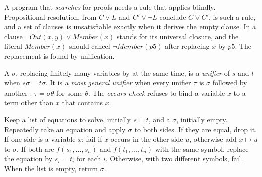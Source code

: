 A program that \emph{searches} for proofs needs a rule that applies blindly. Propositional resolution, from $C \vee L$ and
$C' \vee \neg L$ conclude $C \vee C'$, is such a rule, and a set of clauses is unsatisfiable exactly when it derives the
empty clause. In  a clause $\neg \mathit{Out}(x, y) \vee \mathit{Member}(x)$ stands for its universal
closure, and the literal $\mathit{Member}(x)$ should cancel $\neg\mathit{Member}(p5)$ after replacing $x$ by $p5$. The
replacement is found by unification.

\begin{definition}\label{def:b2:predicate-logic:unification}
A  $\sigma$, replacing finitely many variables by  at the same time, is a
\emph{unifier} of $s$ and $t$ when $s\sigma = t\sigma$. It is a \emph{most general
unifier} when every unifier $\tau$ is $\sigma$ followed by another : $\tau =
\sigma\theta$ for some $\theta$. The \emph{occurs check} refuses to bind a variable $x$ to a term
other than $x$ that contains $x$.
\end{definition}

\begin{method}\label{met:b2:predicate-logic:unify}
Keep a list of equations to solve, initially $s = t$, and a  $\sigma$, initially empty. Repeatedly take an
equation and apply $\sigma$ to both sides. If they are equal, drop it. If one side is a variable $x$: fail if $x$ occurs
in the other side $u$, otherwise add $x \mapsto u$ to $\sigma$. If both are $f(s_1, \dots, s_n)$ and $f(t_1, \dots,
t_n)$ with the same symbol, replace the equation by $s_i = t_i$ for each $i$. Otherwise, with two different symbols,
fail. When the list is empty, return $\sigma$.
\end{method}

\label{lst:b2:predicate-logic:unify}

\label{out:b2:predicate-logic:unify}

